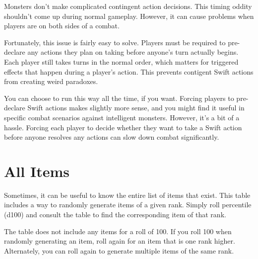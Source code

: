   Monsters don't make complicated contingent action decisions.
  This timing oddity shouldn't come up during normal gameplay.
  However, it can cause problems when players are on both sides of a combat.

  Fortunately, this issue is fairly easy to solve.
  Players must be required to pre-declare any  actions they plan on taking before anyone's turn actually begins.
  Each player still takes turns in the normal order, which matters for triggered effects that happen during a player's action.
  This prevents contigent Swift actions from creating weird paradoxes.

  You can choose to run this way all the time, if you want.
  Forcing players to pre-declare Swift actions makes slightly more sense, and you might find it useful in specific combat scenarios against intelligent monsters.
  However, it's a bit of a hassle.
  Forcing each player to decide whether they want to take a Swift action before anyone resolves any actions can slow down combat significantly.

\section{All Items}

  Sometimes, it can be useful to know the entire list of items that exist.
  This table includes a way to randomly generate items of a given rank.
  Simply roll percentile (d100) and consult the table to find the corresponding item of that rank.

  The table does not include any items for a roll of 100.
  If you roll 100 when randomly generating an item, roll again for an item that is one rank higher.
  Alternately, you can roll again to generate multiple items of the same rank.

  \begin{longcolumn}
    
  \end{longcolumn}
